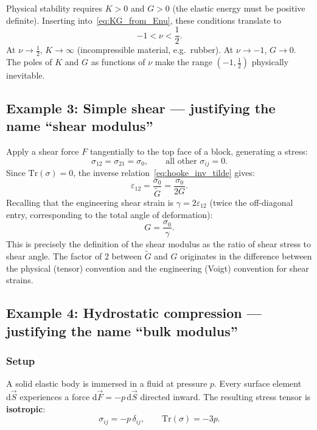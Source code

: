 \begin{remark}
    Physical stability requires $K>0$ and $G>0$ (the elastic energy must be positive definite). Inserting into~\eqref{eq:KG_from_Enu}, these conditions translate to
    \[
        -1 < \nu < \frac{1}{2}.
    \]
    At $\nu\to\tfrac{1}{2}$, $K\to\infty$ (incompressible material, e.g.\ rubber). At $\nu\to -1$, $G\to 0$. The poles of $K$ and $G$ as functions of $\nu$ make the range $(-1,\tfrac{1}{2})$ physically inevitable.
\end{remark}

\subsection*{Example 3: Simple shear — justifying the name ``shear modulus''}

Apply a shear force $F$ tangentially to the top face of a block, generating a stress:
\[
    \sigma_{12} = \sigma_{21} = \sigma_0, \qquad \text{all other } \sigma_{ij}=0.
\]
Since $\mathrm{Tr}(\sigma)=0$, the inverse relation~\eqref{eq:hooke_inv_tilde} gives:
\[
    \varepsilon_{12} = \frac{\sigma_0}{\tilde{G}} = \frac{\sigma_0}{2G}.
\]
Recalling that the engineering shear strain is $\gamma = 2\varepsilon_{12}$ (twice the off-diagonal entry, corresponding to the total angle of deformation):
\[
    G = \frac{\sigma_0}{\gamma}.
\]
This is precisely the definition of the shear modulus as the ratio of shear stress to shear angle. The factor of 2 between $\tilde{G}$ and $G$ originates in the difference between the physical (tensor) convention and the engineering (Voigt) convention for shear strains.

\subsection*{Example 4: Hydrostatic compression — justifying the name ``bulk modulus''}

\subsubsection*{Setup}
A solid elastic body is immersed in a fluid at pressure $p$. Every surface element $\mathrm{d}\vec{S}$ experiences a force $\mathrm{d}\vec{F} = -p\,\mathrm{d}\vec{S}$ directed inward. The resulting stress tensor is \textbf{isotropic}:
\[
    \sigma_{ij} = -p\,\delta_{ij}, \qquad \mathrm{Tr}(\sigma) = -3p.
\]

